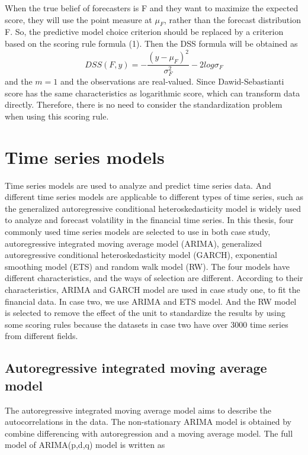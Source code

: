 \documentclass{monashthesis}
\theoremstyle{definition}
\theoremstyle{definition}
\theoremstyle{definition}
\theoremstyle{remark}
\begin{document}
When the true belief of forecasters is F and they want to maximize the
expected score, they will use the point measure at \(\mu_F\), rather
than the forecast distribution F. So, the predictive model choice
criterion should be replaced by a criterion based on the scoring rule
formula (1). Then the DSS formula will be obtained as \[
     DSS(F,y)=-\frac{(y-\mu_F)^2}{\sigma_F^2}-2log\sigma_F
  \] and the \(m=1\) and the observations are real-valued. Since
Dawid-Sebastianti score has the same characteristics as logarithmic
score, which can transform data directly. Therefore, there is no need to
consider the standardization problem when using this scoring rule.

\chapter{Time series models}\label{time-series-models}

Time series models are used to analyze and predict time series data. And
different time series models are applicable to different types of time
series, such as the generalized autoregressive conditional
heteroskedasticity model is widely used to analyze and forecast
volatility in the financial time series. In this thesis, four commonly
used time series models are selected to use in both case study,
autoregressive integrated moving average model (ARIMA), generalized
autoregressive conditional heteroskedasticity model (GARCH), exponential
smoothing model (ETS) and random walk model (RW). The four models have
different characteristics, and the ways of selection are different.
According to their characteristics, ARIMA and GARCH model are used in
case study one, to fit the financial data. In case two, we use ARIMA and
ETS model. And the RW model is selected to remove the effect of the unit
to standardize the results by using some scoring rules because the
datasets in case two have over 3000 time series from different fields.

\section{Autoregressive integrated moving average
model}\label{autoregressive-integrated-moving-average-model}

The autoregressive integrated moving average model aims to describe the
autocorrelations in the data. The non-stationary ARIMA model is obtained
by combine differencing with autoregression and a moving average model.
The full model of ARIMA(p,d,q) model is written as
\end{document}
